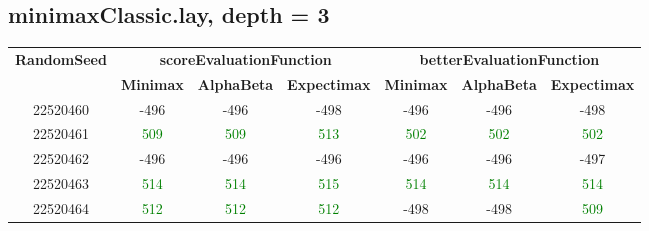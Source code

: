 \documentclass[english, a4paper,12pt]{article}
\begin{document}
\subsection*{minimaxClassic.lay, depth = 3}
\small\begin{tabular}{|c|c|c|c|c|c|c|}
\hline
\textbf{RandomSeed} & \multicolumn{3}{c|}{\textbf{scoreEvaluationFunction}} & \multicolumn{3}{c|}{\textbf{betterEvaluationFunction}} \\
\cline{2-7}
& \textbf{Minimax} & \textbf{AlphaBeta} & \textbf{Expectimax} & \textbf{Minimax} & \textbf{AlphaBeta} & \textbf{Expectimax} \\
\hline
22520460 & \textcolor{red!70}{-496} & \textcolor{red!70}{-496} & \textcolor{red!70}{-498} & \textcolor{red!70}{-496} & \textcolor{red!70}{-496} & \textcolor{red!70}{-498} \\
22520461 & \textcolor{Green}{509} & \textcolor{Green}{509} & \textcolor{Green}{513} & \textcolor{Green}{502} & \textcolor{Green}{502} & \textcolor{Green}{502} \\
22520462 & \textcolor{red!70}{-496} & \textcolor{red!70}{-496} & \textcolor{red!70}{-496} & \textcolor{red!70}{-496} & \textcolor{red!70}{-496} & \textcolor{red!70}{-497} \\
22520463 & \textcolor{Green}{514} & \textcolor{Green}{514} & \textcolor{Green}{515} & \textcolor{Green}{514} & \textcolor{Green}{514} & \textcolor{Green}{514} \\
22520464 & \textcolor{Green}{512} & \textcolor{Green}{512} & \textcolor{Green}{512} & \textcolor{red!70}{-498} & \textcolor{red!70}{-498} & \textcolor{Green}{509} \\
\hline
\end{tabular}
\end{document}
